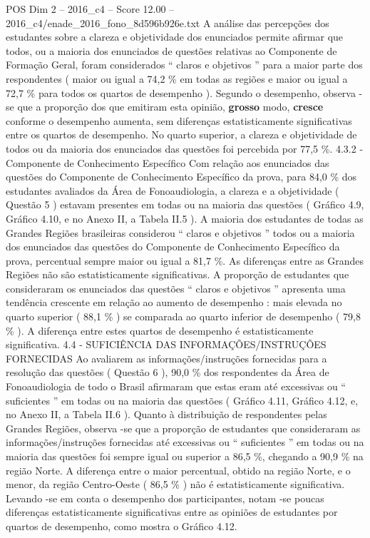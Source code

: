 \begin{textsample}{POS Dim 2 – 2016\_c4 – Score 12.00 – 2016\_c4/enade\_2016\_fono\_8d596b926e.txt}
A análise das percepções dos estudantes sobre a clareza e objetividade dos enunciados permite afirmar que todos, ou a maioria dos enunciados de questões relativas ao Componente de Formação Geral, foram considerados “ claros e objetivos ” para a maior parte dos respondentes ( maior ou igual a 74,2 \% em todas as regiões e maior ou igual a 72,7 \% para todos os quartos de desempenho ).
Segundo o desempenho, observa -se que a proporção dos que emitiram esta opinião, \textbf{grosso} modo, \textbf{cresce} conforme o desempenho aumenta, sem diferenças estatisticamente significativas entre os quartos de desempenho.
No quarto superior, a clareza e objetividade de todos ou da maioria dos enunciados das questões foi percebida por 77,5 \%. 4.3.2 - Componente de Conhecimento Específico Com relação aos enunciados das questões do Componente de Conhecimento Específico da prova, para 84,0 \% dos estudantes avaliados da Área de Fonoaudiologia, a clareza e a objetividade ( Questão 5 ) estavam presentes em todas ou na maioria das questões ( Gráfico 4.9, Gráfico 4.10, e no Anexo II, a Tabela II.5 ).
A maioria dos estudantes de todas as Grandes Regiões brasileiras considerou “ claros e objetivos ” todos ou a maioria dos enunciados das questões do Componente de Conhecimento Específico da prova, percentual sempre maior ou igual a 81,7 \%.
As diferenças entre as Grandes Regiões não são estatisticamente significativas.
A proporção de estudantes que consideraram os enunciados das questões “ claros e objetivos ” apresenta uma tendência crescente em relação ao aumento de desempenho : mais elevada no quarto superior ( 88,1 \% ) se comparada ao quarto inferior de desempenho ( 79,8 \% ).
A diferença entre estes quartos de desempenho é estatisticamente significativa. 4.4 - SUFICIÊNCIA DAS INFORMAÇÕES/INSTRUÇÕES FORNECIDAS Ao avaliarem as informações/instruções fornecidas para a resolução das questões ( Questão 6 ), 90,0 \% dos respondentes da Área de Fonoaudiologia de todo o Brasil afirmaram que estas eram até excessivas ou “ suficientes ” em todas ou na maioria das questões ( Gráfico 4.11, Gráfico 4.12, e, no Anexo II, a Tabela II.6 ).
Quanto à distribuição de respondentes pelas Grandes Regiões, observa -se que a proporção de estudantes que consideraram as informações/instruções fornecidas até excessivas ou “ suficientes ” em todas ou na maioria das questões foi sempre igual ou superior a 86,5 \%, chegando a 90,9 \% na região Norte.
A diferença entre o maior percentual, obtido na região Norte, e o menor, da região Centro-Oeste ( 86,5 \% ) não é estatisticamente significativa.
Levando -se em conta o desempenho dos participantes, notam -se poucas diferenças estatisticamente significativas entre as opiniões de estudantes por quartos de desempenho, como mostra o Gráfico 4.12.

\end{textsample}
